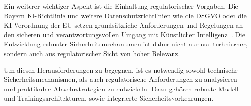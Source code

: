 \documentclass[german,exposee,master]{i1thesis}
\begin{document}
Ein weiterer wichtiger Aspekt ist die Einhaltung regulatorischer Vorgaben. 
Die Bayern KI-Richtlinie und weitere Datenschutzrichtlinien wie die DSGVO oder die KI-Verordnung der EU
setzen grundsätzliche Anforderungen und Regelungen an den sicheren und verantwortungsvollen Umgang mit Künstlicher Intelligenz~\cite{EU_Regulation_2024_1689, DSGVO, Bayern_KI_Richtlinie}.
Die Entwicklung robuster Sicherheitsmechanismen ist daher nicht nur aus technischer, sondern auch aus regulatorischer Sicht von hoher Relevanz.

Um diesen Herausforderungen zu begegnen, ist es notwendig sowohl technische Sicherheitsmechanismen, 
als auch regulatorische Anforderungen zu analysieren und praktikable Abwehrstrategien zu entwickeln. 
Dazu gehören robuste Modell- und Trainingsarchitekturen, sowie integrierte Sicherheitsvorkehrungen.~\cite{yao2024}













\end{document}
